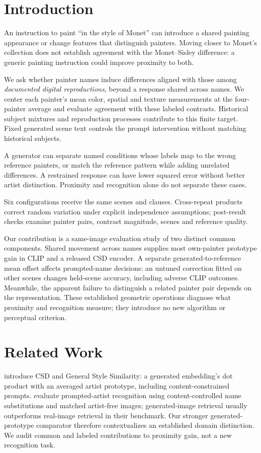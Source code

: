 \section{Introduction}
An instruction to paint ``in the style of Monet'' can introduce a shared
painting appearance or change features that distinguish painters. Moving closer
to Monet's collection does not establish agreement with the Monet--Sisley
difference: a generic painting instruction could improve proximity to both.

We ask whether painter names induce differences aligned with those among
\emph{documented digital reproductions}, beyond a response shared across names.
We center each painter's mean color, spatial and texture measurements at the
four-painter average and evaluate agreement with these labeled contrasts.
Historical subject mixtures and reproduction processes contribute to this finite
target. Fixed generated scene text controls the prompt intervention without
matching historical subjects.

A generator can separate named conditions whose labels map to the wrong
reference painters, or match the reference pattern while adding unrelated
differences. A restrained response can have lower squared error without better
artist distinction. Proximity and recognition alone do not separate these cases.

Six configurations receive the same scenes and clauses. Cross-repeat products
correct random variation under explicit independence assumptions; post-result
checks examine painter pairs, contrast magnitude, scenes and reference quality.

Our contribution is a same-image evaluation study of two distinct common
components. Shared movement across names supplies most own-painter prototype
gain in CLIP and a released CSD encoder. A separate generated-to-reference mean
offset affects prompted-name decisions: an untuned correction fitted on other
scenes changes held-scene accuracy, including adverse CLIP outcomes.
Meanwhile, the apparent failure to distinguish a related painter pair depends
on the representation. These established geometric operations diagnose what
proximity and recognition measure; they introduce no new algorithm or
perceptual criterion.


\section{Related Work}
\citet{somepalli2024style} introduce CSD and General Style Similarity: a generated
embedding's dot product with an averaged artist prototype, including
content-constrained prompts. \citet{su2025prompted} evaluate prompted-artist
recognition using content-controlled name substitutions and matched artist-free
images; generated-image retrieval usually outperforms real-image retrieval in
their benchmark. Our stronger generated-prototype comparator therefore
contextualizes an established domain distinction. We audit common and labeled
contributions to proximity gain, not a new recognition task.

